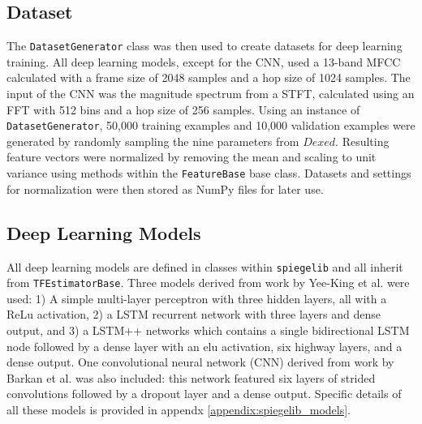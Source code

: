 
\subsection{Dataset}
The \texttt{DatasetGenerator} class was then used to create datasets for deep learning training. All deep learning models, except for the CNN, used a 13-band MFCC calculated with a frame size of 2048 samples and a hop size of 1024 samples. The input of the CNN was the magnitude spectrum from a STFT, calculated using an FFT with 512 bins and a hop size of 256 samples. Using an instance of \texttt{DatasetGenerator}, 50,000 training examples and 10,000 validation examples were generated by randomly sampling the nine parameters from $Dexed$. Resulting feature vectors were normalized by removing the mean and scaling to unit variance using methods within the \texttt{FeatureBase} base class. Datasets and settings for normalization were then stored as NumPy files for later use.

\subsection{Deep Learning Models}



All deep learning models are defined in classes within \texttt{spiegelib} and all inherit from \texttt{TFEstimatorBase}. Three models derived from work by Yee-King et al. \cite{yee2018automatic} were used: 1) A simple multi-layer perceptron with three hidden layers, all with a ReLu activation, 2) a LSTM recurrent network with three layers and dense output, and 3) a LSTM++ networks which contains a single bidirectional LSTM node followed by a dense layer with an elu activation, six highway layers, and a dense output. One convolutional neural network (CNN) derived from work by Barkan et al. \cite{barkan2019inversynth} was also included: this network featured six layers of strided convolutions followed by a dropout layer and a dense output. Specific details of all these models is provided in appendx \ref{appendix:spiegelib_models}.


